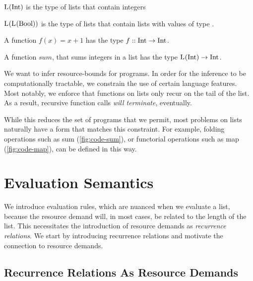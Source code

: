 \begin{example}
   \(\text{L}^{}(\text{Int})\) is the type of lists that contain integers
\end{example}

\begin{example}
   \(\text{L}^{}(\text{L}^{}(\text{Bool}))\) is the type of lists that contain lists with values of type \bool.
\end{example}

\begin{example}
   A function \(f(x) = x+1\) has the type \(f :: \text{Int} \to \text{Int} ^{}_{}\).
\end{example}

\begin{example}
   A function \(sum\), that sums integers in a list has the type \(\text{L}^{}(\text{Int}) \to \text{Int} ^{}_{}\).
\end{example}

We want to infer resource-bounds for programs. In order for the inference to be computationally tractable, we constrain the use of certain language features. Most notably, we enforce that functions on lists only recur on the tail of the list. As a result, recursive function calls \emph{will terminate}, eventually.

While this reduces the set of programs that we permit, most problems on lists naturally have a form that matches this constraint. For example, folding operations such as sum (\cref{fig:code-sum}), or functorial operations such as map (\cref{fig:code-map}), can be defined in this way. 

\section{Evaluation Semantics}

We introduce evaluation rules, which are nuanced when we evaluate a list, because the resource demand will, in most cases, be related to the length of the list. This necessitates the introduction of resource demands as \emph{recurrence relations}. We start by introducing recurrence relations and motivate the connection to resource demands. 

\subsection{Recurrence Relations As Resource Demands}

